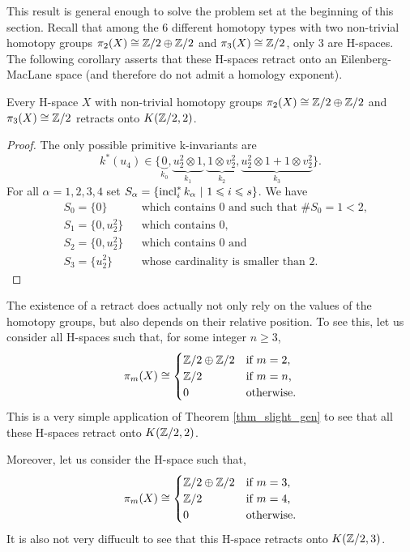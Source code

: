 This result is general enough to solve the problem set at the beginning of this section. Recall that among the $6$ different homotopy types with two non-trivial homotopy groups $\pi_2(X)\cong\mathbb{Z}/2\oplus\mathbb{Z}/2$ and $\pi_3(X)\cong\mathbb{Z}/2$, only $3$ are H-spaces. The following corollary asserts that these H-spaces retract onto an Eilenberg-MacLane space (and therefore do not admit a homology exponent).

\begin{cor}
Every H-space $X$ with non-trivial homotopy groups $\pi_2(X)\cong\mathbb{Z}/2\oplus\mathbb{Z}/2$ and $\pi_3(X)\cong\mathbb{Z}/2$ retracts onto $K(\mathbb{Z}/2,2)$.
\end{cor}

\begin{proof}
The only possible primitive k-invariants are 
$$k^*(u_4)\in\{\underbrace{0}_{k_0},\underbrace{u_2^2\otimes1}_{k_1},\underbrace{1\otimes v_2^2}_{k_2}, \underbrace{u_2^2\otimes1+1\otimes v_2^2}_{k_3}\}.$$ 
For all $\alpha=1,2,3,4$ set $S_\alpha=\{\operatorname{incl}_i^*k_\alpha\ |\ 1\leqslant i\leqslant s\}$. We have
\begin{align*}
&S_0=\{0\} &&\text{which contains $0$ and such that $\#S_0=1<2$,}\\
&S_1=\{0,u_2^2\} &&\text{which contains $0$,}\\
&S_2=\{0,u_2^2\} &&\text{which contains $0$ and}\\
&S_3=\{u_2^2\} &&\text{whose cardinality is smaller than $2$.}
\end{align*}
\end{proof}

The existence of a retract does actually not only rely on the values of the homotopy groups, but also depends on their relative position. To see this, let us consider all H-spaces such that, for some integer $n\geq3$,
$$
\pi_m(X)\cong\begin{cases}
\mathbb{Z}/2\oplus\mathbb{Z}/2 &\text{if $m=2$,}\\
\mathbb{Z}/2 &\text{if $m=n$,}\\
0 &\text{otherwise.}
\end{cases}
$$ This is a very simple application of Theorem \ref{thm_slight_gen} to see that all these H-spaces retract onto $K(\mathbb{Z}/2,2)$. 

Moreover, let us consider the H-space such that,
$$
\pi_m(X)\cong\begin{cases}
\mathbb{Z}/2\oplus\mathbb{Z}/2 &\text{if $m=3$,}\\
\mathbb{Z}/2 &\text{if $m=4$,}\\
0 &\text{otherwise.}
\end{cases}
$$ It is also not very diffucult to see that this H-space retracts onto $K(\mathbb{Z}/2,3)$. 

